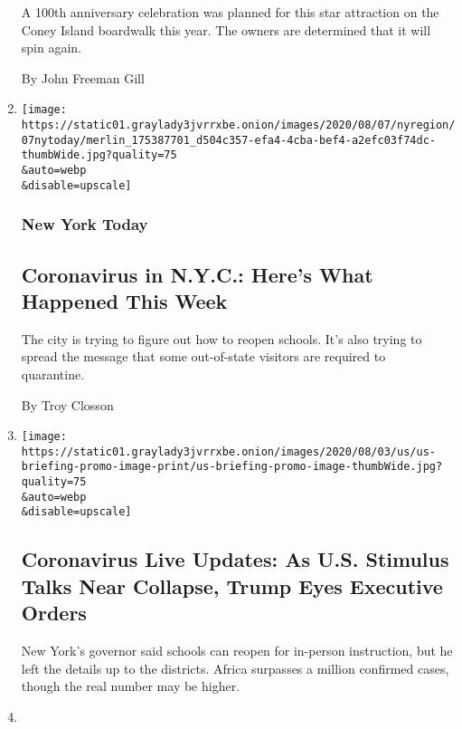 \begin{enumerate}
  A 100th anniversary celebration was planned for this star attraction
  on the Coney Island boardwalk this year. The owners are determined
  that it will spin again.

  By John Freeman Gill
\item
  \href{/2020/08/07/nyregion/coronavirus-nyc.html}{}

  \texttt{[image: https://static01.graylady3jvrrxbe.onion/images/2020/08/07/nyregion/07nytoday/merlin\_175387701\_d504c357-efa4-4cba-bef4-a2efc03f74dc-thumbWide.jpg?quality=75\\\&auto=webp\\\&disable=upscale]}

  \hypertarget{new-york-today}{%
  \subsubsection{New York Today}\label{new-york-today}}

  \hypertarget{coronavirus-in-nyc-heres-what-happened-this-week}{%
  \subsection{Coronavirus in N.Y.C.: Here's What Happened This
  Week}\label{coronavirus-in-nyc-heres-what-happened-this-week}}

  The city is trying to figure out how to reopen schools. It's also
  trying to spread the message that some out-of-state visitors are
  required to quarantine.~

  By Troy Closson
\item
  \href{/2020/08/07/world/covid-19-news.html}{}

  \texttt{[image: https://static01.graylady3jvrrxbe.onion/images/2020/08/03/us/us-briefing-promo-image-print/us-briefing-promo-image-thumbWide.jpg?quality=75\\\&auto=webp\\\&disable=upscale]}

  \hypertarget{coronavirus-live-updates-as-us-stimulus-talks-near-collapse-trump-eyes-executive-orders}{%
  \subsection{Coronavirus Live Updates: As U.S. Stimulus Talks Near
  Collapse, Trump Eyes Executive
  Orders}\label{coronavirus-live-updates-as-us-stimulus-talks-near-collapse-trump-eyes-executive-orders}}

  New York's governor said schools can reopen for in-person instruction,
  but he left the details up to the districts. Africa surpasses a
  million confirmed cases, though the real number may be higher.
\item
  \href{/2020/08/07/style/coronavirus-nyc-historic-season.html}{}


\end{enumerate}
